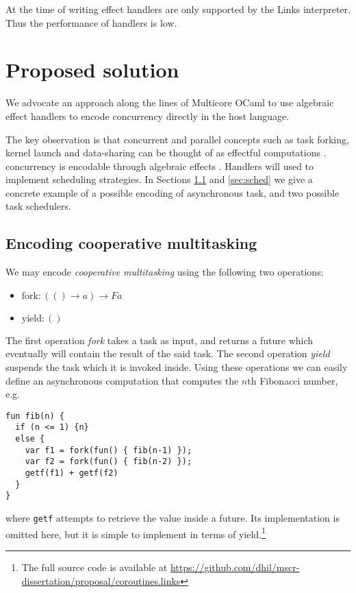 \documentclass[preprint,10pt,numbers]{sigplanconf}
\begin{document}
At the time of writing effect handlers are only supported by the Links interpreter. Thus the performance of handlers is low.

  \section{Proposed solution}\label{sec:proposedsolution}
We advocate an approach along the lines of Multicore OCaml to use algebraic effect handlers to encode concurrency directly in the host language. 

The key observation is that concurrent and parallel concepts such as task forking, kernel launch and data-sharing can be thought of as effectful computations \cite{Bauer2015,Dolan2015}. concurrency is encodable through algebraic effects \cite{Bauer2015,Dolan2015}. Handlers will used to implement scheduling strategies. In Sections \ref{sec:eff} and \ref{sec:sched} we give a concrete example of a possible encoding of asynchronous task, and two possible task schedulers.

\subsection{Encoding cooperative multitasking}\label{sec:eff}
We may encode \emph{cooperative multitasking} using the following two operations:
\begin{itemize}
  \item $\text{fork} : (() \to a) \to F a$
  \item $\text{yield} : ()$
\end{itemize}
The first operation \emph{fork} takes a task as input, and returns a future which eventually will contain the result of the said task. The second operation \emph{yield} suspends the task which it is invoked inside. Using these operations we can easily define an asynchronous computation that computes the $n$th Fibonacci number, e.g. 
\begin{lstlisting}[style={links},caption={}]
fun fib(n) {
  if (n <= 1) {n}
  else {
    var f1 = fork(fun() { fib(n-1) });
    var f2 = fork(fun() { fib(n-2) });
    getf(f1) + getf(f2)
  }
}
\end{lstlisting}
where \texttt{getf} attempts to retrieve the value inside a future. Its implementation is omitted here, but it is simple to implement in terms of yield.\footnote{The full source code is available at \url{https://github.com/dhil/mscr-dissertation/proposal/coroutines.links}} 
\end{document}
